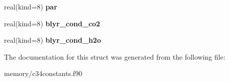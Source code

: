 \begin{DoxyCompactItemize}
\item 
\hypertarget{structc34constants_1_1metinp__vars_a5d75984acca70974ff8c6bd53628f1d0}{
real(kind=8) {\bfseries par}}
\label{structc34constants_1_1metinp__vars_a5d75984acca70974ff8c6bd53628f1d0}

\item 
\hypertarget{structc34constants_1_1metinp__vars_ae63f70b21c3fef8d5391bc83cfde59ef}{
real(kind=8) {\bfseries blyr\_\-cond\_\-co2}}
\label{structc34constants_1_1metinp__vars_ae63f70b21c3fef8d5391bc83cfde59ef}

\item 
\hypertarget{structc34constants_1_1metinp__vars_a7ed34576d79e934624129cd706e52283}{
real(kind=8) {\bfseries blyr\_\-cond\_\-h2o}}
\label{structc34constants_1_1metinp__vars_a7ed34576d79e934624129cd706e52283}

\end{DoxyCompactItemize}


The documentation for this struct was generated from the following file:\begin{DoxyCompactItemize}
\item 
memory/c34constants.f90\end{DoxyCompactItemize}

